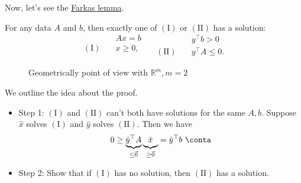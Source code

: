 Now, let's see the \hyperref[lma:Farkas]{Farkas lemma}.

\begin{lemma}\label{lma:Farkas}
	For any data \(A\) and \(b\), then exactly one of \((\mathrm{I})\) or \((\mathrm{II})\) has a solution:
	\[
		\begin{aligned}
			                   & Ax = b   \\
			(\mathrm{I}) \quad & x\geq 0, \\
		\end{aligned}\quad
		\begin{aligned}
			                    & y^{\top}b > 0    \\
			(\mathrm{II}) \quad & y^{\top}A\leq 0.
		\end{aligned}
	\]
\end{lemma}

\begin{figure}[H]
	\centering
	\caption{Geometrically point of view with \(\mathbb{R}^m, m = 2\) }
	\label{fig:Farkas-lemma}
\end{figure}

\begin{intuition}
	We outline the idea about the proof.
	\begin{itemize}
		\item Step 1: \((\mathrm{I})\) and \((\mathrm{II})\) can't both have solutions for the same \(A, b\). Suppose \(\hat{x}\) solves \((\mathrm{I})\) and \(\hat{y}\) solves \((\mathrm{II})\). Then we have
		      \[
			      0\geq \underbrace{\hat{y}^{\top} A}_{\leq \vec{0}} \underbrace{\vphantom{\hat{y}^{\top}A} \hat{x}}_{\geq \vec{0}} = \hat{y}^{\top} b\ \conta
		      \]
		\item Step 2: Show that if \((\mathrm{I})\) has no solution, then \((\mathrm{II})\) has a solution.
	\end{itemize}
\end{intuition}